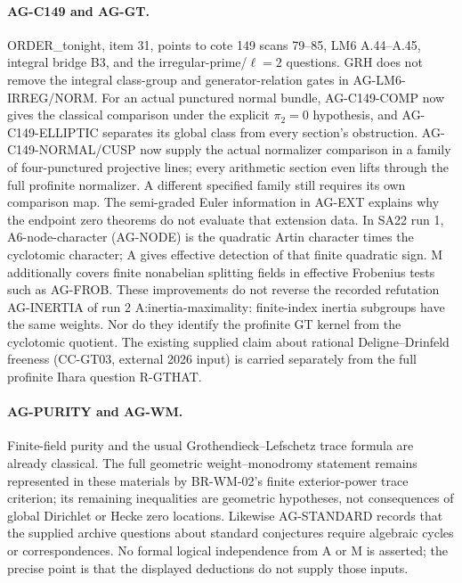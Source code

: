 \documentclass[11pt,a4paper]{article}
\begin{document}
\paragraph{AG-C149 and AG-GT.} ORDER\_tonight, item 31, points to cote
149 scans 79--85, LM6 A.44--A.45, integral bridge B3, and the
irregular-prime/$\ell=2$ questions. GRH does not remove the integral
class-group and generator-relation gates in AG-LM6-IRREG/NORM.
For an actual punctured normal bundle, AG-C149-COMP now gives the
classical comparison under the explicit $\pi_2=0$ hypothesis, and
AG-C149-ELLIPTIC separates its global class from every section's
obstruction. AG-C149-NORMAL/CUSP now supply the actual normalizer
comparison in a family of four-punctured projective lines; every
arithmetic section even lifts through the full profinite normalizer.
A different specified family still requires its own comparison map.
The semi-graded Euler information in AG-EXT explains why the endpoint
zero theorems do not evaluate that extension data. In SA22 run 1,
A6-node-character (AG-NODE) is the quadratic Artin character times the cyclotomic
character; A gives effective detection of that finite quadratic sign.
M additionally covers finite nonabelian splitting fields in effective
Frobenius tests such as AG-FROB. These improvements do not reverse the
recorded refutation AG-INERTIA of run 2 A:inertia-maximality: finite-index inertia
subgroups have the same weights. Nor do they identify the profinite GT
kernel from the cyclotomic quotient. The existing supplied claim about
rational Deligne--Drinfeld freeness (CC-GT03, external 2026 input) is
carried separately from the full profinite Ihara question R-GTHAT.

\paragraph{AG-PURITY and AG-WM.} Finite-field purity and the usual
Grothendieck--Lefschetz trace formula are already classical. The full
geometric weight--monodromy statement remains represented in these
materials by BR-WM-02's finite exterior-power trace criterion; its
remaining inequalities are geometric hypotheses, not consequences of
global Dirichlet or Hecke zero locations. Likewise AG-STANDARD records that the supplied archive
questions about standard conjectures require algebraic cycles or
correspondences. No formal logical independence from A or M is asserted;
the precise point is that the displayed deductions do not supply those
inputs.

\end{document}
